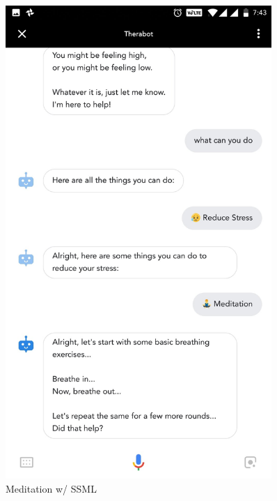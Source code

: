 \vspace*{\fill}
\begin{figure}[H]
    \centering
    \begin{minipage}{0.45\textwidth}
        \centering
        \includegraphics[width=0.9\textwidth]{images/screenshots/chatbot/7.jpg}
        \caption{Meditation w/ SSML}
    \end{minipage}\hfill
    \begin{minipage}{0.45\textwidth}
        \centering

\end{minipage}
\end{figure}
